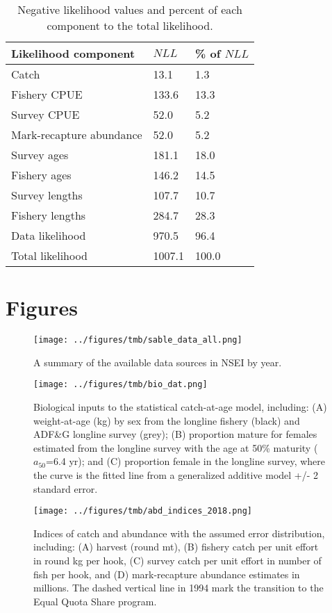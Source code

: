 \documentclass[]{article}
\begin{document}
\begin{table}

\caption{\label{tab:likesum}Negative likelihood values and percent of each component to the total likelihood.}
\centering
\begin{tabular}[t]{lll}
\toprule
Likelihood component & $NLL$ & \% of $NLL$\\
\midrule
Catch & 13.1 & 1.3\\
Fishery CPUE & 133.6 & 13.3\\
Survey CPUE & 52.0 & 5.2\\
Mark-recapture abundance & 52.0 & 5.2\\
Survey ages & 181.1 & 18.0\\
\addlinespace
Fishery ages & 146.2 & 14.5\\
Survey lengths & 107.7 & 10.7\\
Fishery lengths & 284.7 & 28.3\\
Data likelihood & 970.5 & 96.4\\
Total likelihood & 1007.1 & 100.0\\
\bottomrule
\end{tabular}
\end{table}

\pagebreak

\section{Figures}\label{figures}

\begin{figure}
\centering
\texttt{[image: ../figures/tmb/sable\_data\_all.png]}
\caption{\label{fig:datsrc}A summary of the available data sources in NSEI
by year.}
\end{figure}

\begin{figure}
\centering
\texttt{[image: ../figures/tmb/bio\_dat.png]}
\caption{\label{fig:bioinputs}Biological inputs to the statistical
catch-at-age model, including: (A) weight-at-age (kg) by sex from the
longline fishery (black) and ADF\&G longline survey (grey); (B)
proportion mature for females estimated from the longline survey with
the age at 50\% maturity (\(a_{50}\)=6.4 yr); and (C) proportion female
in the longline survey, where the curve is the fitted line from a
generalized additive model +/- 2 standard error.}
\end{figure}

\begin{figure}
\centering
\texttt{[image: ../figures/tmb/abd\_indices\_2018.png]}
\caption{\label{fig:abdind}Indices of catch and abundance with the assumed
error distribution, including: (A) harvest (round mt), (B) fishery catch
per unit effort in round kg per hook, (C) survey catch per unit effort
in number of fish per hook, and (D) mark-recapture abundance estimates
in millions. The dashed vertical line in 1994 mark the transition to the
Equal Quota Share program.}
\end{figure}
\end{document}
